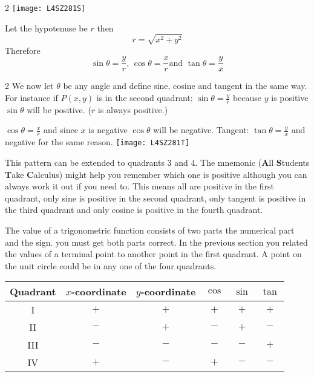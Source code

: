 \begin {multicols}{2}
\texttt{[image: L4SZ281S]}

Let the hypotenuse be $r$ then
\begin{equation*}r =\sqrt{x^{2} +y^{2}}
\end{equation*}
Therefore
\begin{equation*}\sin  \theta  =\frac{y}{r}\text{, }\cos  \theta  =\frac{x}{r}\text{and }\tan  \theta  =\frac{y}{x}
\end{equation*}
\end {multicols}
\begin {multicols}{2}
We now let $\theta $ be any angle and define sine, cosine and tangent in the same way. For instance if $P (x ,y)$ is in the second quadrant: $\sin  \theta  =\frac{y}{r}$ because $y$ is positive $\sin  \theta $ will be positive. ($r$ is always positive.) 

$\cos  \theta  =\frac{x}{r}$ and since $x$ is negative $\cos  \theta $ will be negative. Tangent: $\tan  \theta  =\frac{y}{x}$ and negative for the same reason.
\texttt{[image: L4SZ281T]}
\end{multicols}

This pattern can be extended to quadrants 3 and 4. The mnemonic (\textbf{A}ll \textbf{S}tudents \textbf{T}ake \textbf{C}alculus) might help you remember which one is positive although you can always work it out if you need to. This means all are positive in the first quadrant, only sine is positive in the second quadrant, only tangent is positive in the third quadrant and only cosine is positive in the fourth quadrant.

The value of a trigonometric function consists of two parts the numerical part and the sign. you must get both parts correct. In the previous section you related the values of a terminal point to another point in the first quadrant. A point on the unit circle could be in any one of the four quadrants. 

\qquad \qquad \qquad \qquad
\begin{tabular}[c]{|c|c|c|c|c|c|}\hline
	Quadrant  & $x$-coordinate  & $y$-coordinate  & $\cos $  & $\sin $  & $\tan $  \\
	\hline
	I  & $ +$  & $ +$  & $ +$  & $ +$  & $ +$  \\
	\hline
	II  & $ -$  & $ +$  & $ -$  & $ +$  & $ -$  \\
	\hline
	III  & $ -$  & $ -$  & $ -$  & $ -$  & $ +$  \\
	\hline
	IV  & $ +$  & $ -$  & $ +$  & $ -$  & $ -$  \\
	\hline
\end{tabular}

